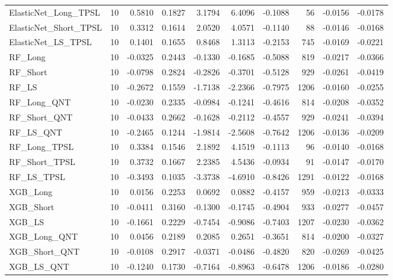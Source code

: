 \begin{tabular}{llrrrrrrrr}
\cline{1-10}
ElasticNet\_Long\_TPSL & 10 & 0.5810 & 0.1827 & 3.1794 & 6.4096 & -0.1088 & 56 & -0.0156 & -0.0178 \\
\cline{1-10}
ElasticNet\_Short\_TPSL & 10 & 0.3312 & 0.1614 & 2.0520 & 4.0571 & -0.1140 & 88 & -0.0146 & -0.0168 \\
\cline{1-10}
ElasticNet\_LS\_TPSL & 10 & 0.1401 & 0.1655 & 0.8468 & 1.3113 & -0.2153 & 745 & -0.0169 & -0.0221 \\
\cline{1-10}
RF\_Long & 10 & -0.0325 & 0.2443 & -0.1330 & -0.1685 & -0.5088 & 819 & -0.0217 & -0.0366 \\
\cline{1-10}
RF\_Short & 10 & -0.0798 & 0.2824 & -0.2826 & -0.3701 & -0.5128 & 929 & -0.0261 & -0.0419 \\
\cline{1-10}
RF\_LS & 10 & -0.2672 & 0.1559 & -1.7138 & -2.2366 & -0.7975 & 1206 & -0.0160 & -0.0255 \\
\cline{1-10}
RF\_Long\_QNT & 10 & -0.0230 & 0.2335 & -0.0984 & -0.1241 & -0.4616 & 814 & -0.0208 & -0.0352 \\
\cline{1-10}
RF\_Short\_QNT & 10 & -0.0433 & 0.2662 & -0.1628 & -0.2112 & -0.4557 & 929 & -0.0241 & -0.0394 \\
\cline{1-10}
RF\_LS\_QNT & 10 & -0.2465 & 0.1244 & -1.9814 & -2.5608 & -0.7642 & 1206 & -0.0136 & -0.0209 \\
\cline{1-10}
RF\_Long\_TPSL & 10 & 0.3384 & 0.1546 & 2.1892 & 4.1519 & -0.1113 & 96 & -0.0140 & -0.0168 \\
\cline{1-10}
RF\_Short\_TPSL & 10 & 0.3732 & 0.1667 & 2.2385 & 4.5436 & -0.0934 & 91 & -0.0147 & -0.0170 \\
\cline{1-10}
RF\_LS\_TPSL & 10 & -0.3493 & 0.1035 & -3.3738 & -4.6910 & -0.8426 & 1291 & -0.0122 & -0.0168 \\
\cline{1-10}
XGB\_Long & 10 & 0.0156 & 0.2253 & 0.0692 & 0.0882 & -0.4157 & 959 & -0.0213 & -0.0333 \\
\cline{1-10}
XGB\_Short & 10 & -0.0411 & 0.3160 & -0.1300 & -0.1745 & -0.4904 & 933 & -0.0277 & -0.0457 \\
\cline{1-10}
XGB\_LS & 10 & -0.1661 & 0.2229 & -0.7454 & -0.9086 & -0.7403 & 1207 & -0.0230 & -0.0362 \\
\cline{1-10}
XGB\_Long\_QNT & 10 & 0.0456 & 0.2189 & 0.2085 & 0.2651 & -0.3651 & 814 & -0.0200 & -0.0327 \\
\cline{1-10}
XGB\_Short\_QNT & 10 & -0.0108 & 0.2917 & -0.0371 & -0.0486 & -0.4820 & 820 & -0.0269 & -0.0425 \\
\cline{1-10}
XGB\_LS\_QNT & 10 & -0.1240 & 0.1730 & -0.7164 & -0.8963 & -0.6478 & 1206 & -0.0186 & -0.0280 \\

\end{tabular}
